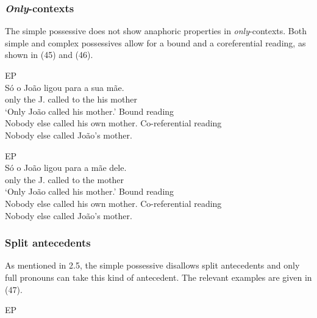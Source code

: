 \documentclass[output=paper]{langsci/langscibook}
\begin{document}
\subsubsection{\textit{Only}-contexts}%

The simple possessive does not show anaphoric properties in \textit{only}{}-contexts. Both simple and complex possessives allow for a bound and a coreferential reading, as shown in (45) and (46).

\ea%
         EP\label{ex:wein:45}\\
    \ea  
    \gll Só o João ligou para a sua mãe.\\
         only the J. called to the his mother\\
    \glt ‘Only João called his mother.’
    \ex  Bound reading\\
         Nobody else called his own mother.
    \ex  Co-referential reading\\
         Nobody else called João’s mother.
    \z
\z


\ea%
         EP\label{ex:wein:46}\\
    \ea  
    \gll Só o João ligou para a mãe dele.  \\
         only the J. called to the mother\\
    \glt ‘Only João called his mother.’
    \ex  Bound reading\\
         Nobody else called his own mother.
    \ex  Co-referential reading\\
         Nobody else called João’s mother.
    \z
\z



\subsubsection{Split antecedents}%

As mentioned in 2.5, the simple possessive disallows split antecedents and only full pronouns can take this kind of antecedent. The relevant examples are given in (47).

\ea%
         EP\label{ex:wein:47}
    \z
\z
\end{document}
